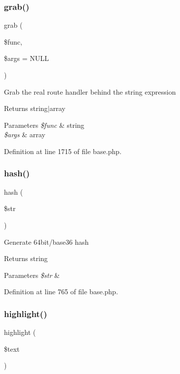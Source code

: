 \subsubsection{\texorpdfstring{grab()}{grab()}}
{\footnotesize\ttfamily grab (\begin{DoxyParamCaption}\item[{}]{\$func,  }\item[{}]{\$args = {\ttfamily NULL} }\end{DoxyParamCaption})}

Grab the real route handler behind the string expression \begin{DoxyReturn}{Returns}
string$\vert$array 
\end{DoxyReturn}

\begin{DoxyParams}{Parameters}
{\em \$func} & string \\
\hline
{\em \$args} & array \\
\hline
\end{DoxyParams}


Definition at line 1715 of file base.\+php.

\hypertarget{class_base_aea8db0058c00fd2bc1351ddb2ebf3191}{}\label{class_base_aea8db0058c00fd2bc1351ddb2ebf3191} 
\subsubsection{\texorpdfstring{hash()}{hash()}}
{\footnotesize\ttfamily hash (\begin{DoxyParamCaption}\item[{}]{\$str }\end{DoxyParamCaption})}

Generate 64bit/base36 hash \begin{DoxyReturn}{Returns}
string 
\end{DoxyReturn}

\begin{DoxyParams}{Parameters}
{\em \$str} & \\
\hline
\end{DoxyParams}


Definition at line 765 of file base.\+php.

\hypertarget{class_base_a9e02fb072a50fb8358713128b41ba417}{}\label{class_base_a9e02fb072a50fb8358713128b41ba417} 
\subsubsection{\texorpdfstring{highlight()}{highlight()}}
{\footnotesize\ttfamily highlight (\begin{DoxyParamCaption}\item[{}]{\$text }\end{DoxyParamCaption})}

